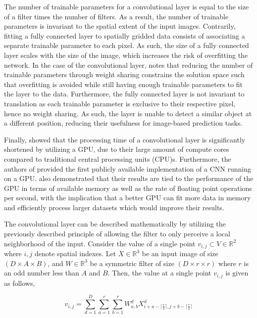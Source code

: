 \documentclass[../main/thesis.tex]{subfiles}
\begin{document}
The number of trainable parameters for a convolutional layer is equal to the size of a filter times the number of filters. As a result, the number of trainable parameters is invariant to the spatial extent of the input images. Contrarily, fitting a fully connected layer to spatially gridded data consists of associating a separate trainable parameter to each pixel. As such, the size of a fully connected layer scales with the size of the image, which increases the risk of overfitting the network. In the case of the convolutional layer, \citet{LeCun1989} notes that reducing the number of trainable parameters through weight sharing constrains the solution space such that overfitting is avoided while still having enough trainable parameters to fit the layer to the data. Furthermore, the fully connected layer is not invariant to translation as each trainable parameter is exclusive to their respective pixel, hence no weight sharing. As such, the layer is unable to detect a similar object at a different position, reducing their usefulness for image-based prediction tasks.

Finally, \citet{Ciresan2012} showed that the processing time of a convolutional layer is significantly shortened by utilizing a GPU, due to their large amount of compute cores compared to traditional central processing units (CPU)s. Furthermore, the authors of \citet{Krizhevsky2012} provided the first publicly available implementation of a CNN running on a GPU. \citet{Krizhevsky2012} also demonstrated that their results are tied to the performance of the GPU in terms of available memory as well as the rate of floating point operations per second, with the implication that a better GPU can fit more data in memory and efficiently process larger datasets which would improve their results.

The convolutional layer can be described mathematically by utilizing the previously described principle of allowing the filter to only perceive a local neighborhood of the input. Consider the value of a single point $v_{i,j} \subset V \in{\mathbb{R}^2}$ where $i,j$ denote spatial indexes. Let $X \in{\mathbb{R}^3}$ be an input image of size $(D \times A \times B)$, and $W \in{\mathbb{R}^3}$ be a symmetric filter of size $(D \times r \times r)$ where $r$ is an odd number less than $A$ and $B$. Then, the value at a single point $v_{i,j}$ is given as follows,

\begin{equation}
    \label{eq:singlepointconv}
    v_{i,j} = \sum_{d=1}^D \sum_{a=1}^r \sum_{b=1}^r W_{a, b}^d X_{i+a-\lceil \frac{r}{2} \rceil,j+b-\lceil \frac{r}{2} \rceil}^d
\end{equation}
\end{document}
